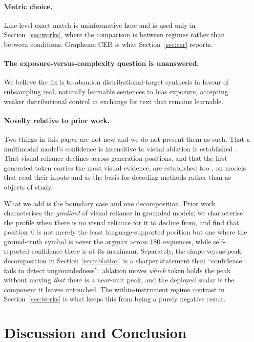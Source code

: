 \documentclass{article}
\begin{document}
\paragraph{Metric choice.} Line-level exact match is uninformative here and is used only in
Section~\ref{sec:works}, where the comparison is between regimes rather than between
conditions. Grapheme CER is what Section~\ref{sec:cer} reports.

\paragraph{The exposure-versus-complexity question is unanswered.} We believe the fix is to
abandon distributional-target synthesis in favour of subsampling real, naturally learnable
sentences to bias exposure, accepting weaker distributional control in exchange for text that
remains learnable.

\paragraph{Novelty relative to prior work.} Two things in this paper are not new and we do not
present them as such. That a multimodal model's confidence is insensitive to visual ablation is
established \citep{khanmohammadi2026bicr}. That visual reliance declines across generation
positions, and that the first generated token carries the most visual evidence, are established
too \citep{favero2024m3id,ha2026flb}, on models that read their inputs and as the basis for
decoding methods rather than as objects of study.

What we add is the boundary case and one decomposition. Prior work characterises the
\emph{gradient} of visual reliance in grounded models; we characterise the profile when there
is no visual reliance for it to decline from, and find that position~0 is not merely the least
language-supported position but one where the ground-truth symbol is never the argmax across
180 sequences, while self-reported confidence there is at its maximum. Separately, the
shape-versus-peak decomposition in Section~\ref{sec:ablation} is a sharper statement than
``confidence fails to detect ungroundedness'': ablation moves \emph{which} token holds the
peak without moving \emph{that} there is a near-unit peak, and the deployed scalar is the
component it leaves untouched. The within-instrument regime contrast in
Section~\ref{sec:works} is what keeps this from being a purely negative result.

\section{Discussion and Conclusion}
\end{document}
